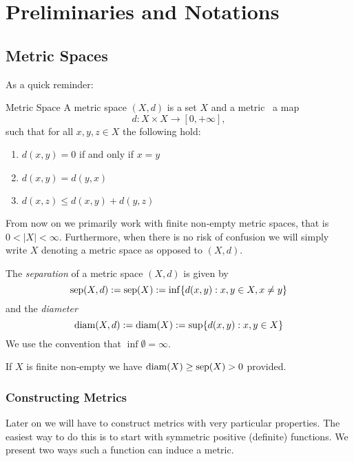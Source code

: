 \chapter{Preliminaries and Notations}

\section{Metric Spaces}
As a quick reminder:
\begin{definition}{Metric Space}{}
A metric space $(X,d)$ is a set $X$ and a metric \Ie\ a map
\begin{equation*}
d: X \times X \to [0, +\infty],
\end{equation*}
such that for all $x,y,z \in X$ the following hold:
\begin{enumerate}
    \item $d(x,y) = 0$ if and only if $x = y$
    \item $d(x,y) = d(y,x)$
    \item $d(x,z) \leq d(x,y) + d(y,z)$
\end{enumerate}
\end{definition}
From now on we primarily work with finite non-empty metric spaces, that is $0 < |X| < \infty$.
Furthermore, when there is no risk of confusion we will simply write $X$ denoting a metric space as opposed to $(X,d)$.

\begin{definition}{}{}
The \emph{separation} of a metric space $(X,d)$ is given by
\begin{equation*}
\mathrm{sep}(X,d) := \mathrm{sep}(X) := \inf\{d(x,y): x,y \in X, x \neq y\}
\end{equation*}
and the \emph{diameter}
\begin{equation*}
\mathrm{diam}(X,d) := \mathrm{diam}(X) := \sup\{d(x,y): x,y \in X\}
\end{equation*}
We use the convention that $\inf \emptyset = \infty$. 
\end{definition}

If $X$ is finite non-empty we have $\mathrm{diam}(X) \geq \mathrm{sep}(X) > 0$ provided.

\subsection{Constructing Metrics}
Later on we will have to construct metrics with very particular properties. The easiest way to do this is to start with symmetric positive (definite) functions. We present two ways such a function can induce a metric.

